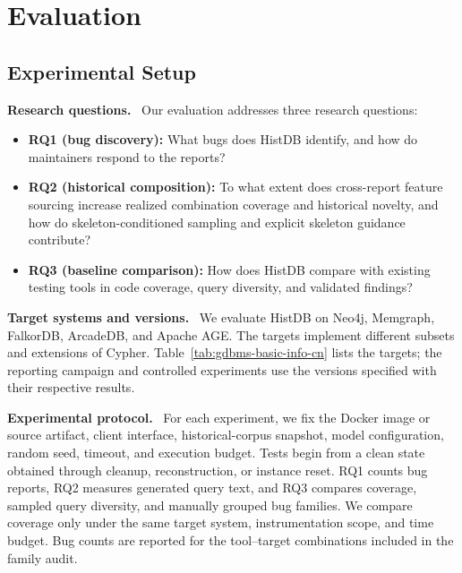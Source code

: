 \documentclass[acmsmall,screen,anonymous]{acmart}
\newcommand{\cnpara}[1]{\par\noindent\textbf{#1.}\ }
\begin{document}
\section{Evaluation}
\label{sec:evaluation}

\subsection{Experimental Setup}
\label{sec:eval-setup}

\cnpara{Research questions}
Our evaluation addresses three research questions:
\begin{itemize}
\item \textbf{RQ1 (bug discovery):} What bugs does HistDB identify, and how do maintainers respond to the reports?
\item \textbf{RQ2 (historical composition):} To what extent does cross-report feature sourcing increase realized combination coverage and historical novelty, and how do skeleton-conditioned sampling and explicit skeleton guidance contribute?
\item \textbf{RQ3 (baseline comparison):} How does HistDB compare with existing testing tools in code coverage, query diversity, and validated findings?
\end{itemize}

\cnpara{Target systems and versions}
We evaluate HistDB on Neo4j, Memgraph, FalkorDB, ArcadeDB, and Apache AGE. The targets implement different subsets and extensions of Cypher. Table~\ref{tab:gdbms-basic-info-cn} lists the targets; the reporting campaign and controlled experiments use the versions specified with their respective results.

\begin{table}[htbp]

\end{table}

\cnpara{Experimental protocol}
For each experiment, we fix the Docker image or source artifact, client interface, historical-corpus snapshot, model configuration, random seed, timeout, and execution budget. Tests begin from a clean state obtained through cleanup, reconstruction, or instance reset. RQ1 counts bug reports, RQ2 measures generated query text, and RQ3 compares coverage, sampled query diversity, and manually grouped bug families. We compare coverage only under the same target system, instrumentation scope, and time budget. Bug counts are reported for the tool--target combinations included in the family audit.
\end{document}
